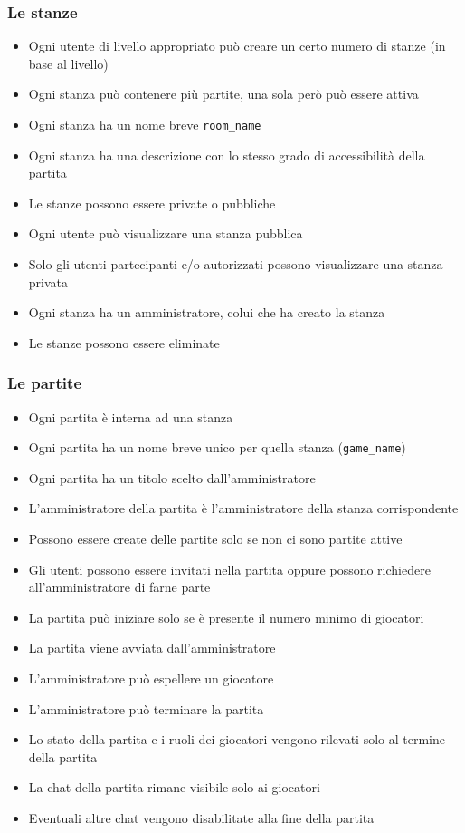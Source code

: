 \documentclass[10pt,a4paper]{article}
\begin{document}
\subsubsection{Le stanze}
\begin{itemize}
\item Ogni utente di livello appropriato può creare un certo numero di stanze (in base al livello)
\item Ogni stanza può contenere più partite, una sola però può essere attiva
\item Ogni stanza ha un nome breve \texttt{room\_name}
\item Ogni stanza ha una descrizione con lo stesso grado di accessibilità della partita
\item Le stanze possono essere private o pubbliche
\item Ogni utente può visualizzare una stanza pubblica
\item Solo gli utenti partecipanti e/o autorizzati possono visualizzare una stanza privata
\item Ogni stanza ha un amministratore, colui che ha creato la stanza
\item Le stanze possono essere eliminate
\end{itemize}

\subsubsection{Le partite}
\begin{itemize}
\item Ogni partita è interna ad una stanza
\item Ogni partita ha un nome breve unico per quella stanza (\texttt{game\_name})
\item Ogni partita ha un titolo scelto dall'amministratore
\item L'amministratore della partita è l'amministratore della stanza corrispondente
\item Possono essere create delle partite solo se non ci sono partite attive
\item Gli utenti possono essere invitati nella partita oppure possono richiedere all'amministratore di farne parte
\item La partita può iniziare solo se è presente il numero minimo di giocatori
\item La partita viene avviata dall'amministratore
\item L'amministratore può espellere un giocatore
\item L'amministratore può terminare la partita
\item Lo stato della partita e i ruoli dei giocatori vengono rilevati solo al termine della partita
\item La chat della partita rimane visibile solo ai giocatori
\item Eventuali altre chat vengono disabilitate alla fine della partita
\end{itemize}
\end{document}
